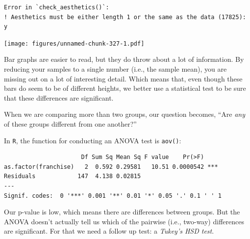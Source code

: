 \documentclass[]{book}
\newenvironment{Shaded}{\begin{snugshade}}{\end{snugshade}}
\newcommand{\DataTypeTok}[1]{\textcolor[rgb]{0.13,0.29,0.53}{#1}}
\newcommand{\DecValTok}[1]{\textcolor[rgb]{0.00,0.00,0.81}{#1}}
\newcommand{\FloatTok}[1]{\textcolor[rgb]{0.00,0.00,0.81}{#1}}
\newcommand{\KeywordTok}[1]{\textcolor[rgb]{0.13,0.29,0.53}{\textbf{#1}}}
\newcommand{\NormalTok}[1]{#1}
\newcommand{\OperatorTok}[1]{\textcolor[rgb]{0.81,0.36,0.00}{\textbf{#1}}}
\newcommand{\StringTok}[1]{\textcolor[rgb]{0.31,0.60,0.02}{#1}}
\begin{document}
\begin{verbatim}
Error in `check_aesthetics()`:
! Aesthetics must be either length 1 or the same as the data (17825): y
\end{verbatim}

\texttt{[image: figures/unnamed-chunk-327-1.pdf]}

Bar graphs are easier to read, but they do throw about a lot of information. By reducing your samples to a single number (i.e., the sample mean), you are missing out on a lot of interesting detail. Which means that, even though these bars do seem to be of different heights, we better use a statistical test to be sure that these differences are significant.

When we are comparing more than two groups, our question becomes, ``Are \emph{any} of these groups different from one another?''

In \texttt{R}, the function for conducting an ANOVA test is \texttt{aov()}:

\begin{verbatim}
                      Df Sum Sq Mean Sq F value    Pr(>F)    
as.factor(franchise)   2  0.592 0.29581   10.51 0.0000542 ***
Residuals            147  4.138 0.02815                      
---
Signif. codes:  0 '***' 0.001 '**' 0.01 '*' 0.05 '.' 0.1 ' ' 1
\end{verbatim}

Our p-value is low, which means there are differences between groups. But the ANOVA doesn't actually tell us which of the pairwise (i.e., two-way) differences are significant. For that we need a follow up test: a \emph{Tukey's HSD test}.

\begin{Shaded}
\end{Shaded}
\end{document}
